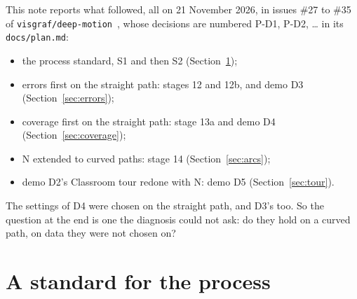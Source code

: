 \documentclass[11pt,a4paper]{article}
\newcommand{\code}[1]{\texttt{\small #1}}
\newcommand{\pth}[1]{{\small\nolinkurl{#1}}}   %
\begin{document}
This note reports what followed, all on 21 November 2026, in issues \#27 to \#35 of
\code{visgraf/deep-motion}~\cite{dm}, whose decisions are numbered P-D1, P-D2, \ldots{} in its \pth{docs/plan.md}:
\begin{itemize}
\item the process standard, S1 and then S2 (Section~\ref{sec:standard});
\item errors first on the straight path: stages 12 and 12b, and demo D3 (Section~\ref{sec:errors});
\item coverage first on the straight path: stage 13a and demo D4 (Section~\ref{sec:coverage});
\item N extended to curved paths: stage 14 (Section~\ref{sec:arcs});
\item demo D2's Classroom tour redone with N: demo D5 (Section~\ref{sec:tour}).
\end{itemize}
The settings of D4 were chosen on the straight path, and D3's too. So the question at the end is one the diagnosis
could not ask: do they hold on a curved path, on data they were not chosen on?

\section{A standard for the process}\label{sec:standard}
\end{document}
